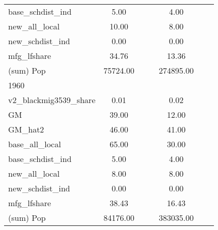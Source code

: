\begin{table}[htbp]
\begin{tabular}{l*{2}{ccc}}
base\_schdist\_ind    &        5.00&            &            &        4.00&            &            \\
new\_all\_local       &       10.00&            &            &        8.00&            &            \\
new\_schdist\_ind     &        0.00&            &            &        0.00&            &            \\
mfg\_lfshare         &       34.76&            &            &       13.36&            &            \\
(sum) Pop           &    75724.00&            &            &   274895.00&            &            \\
\midrule
1960                &            &            &            &            &            &            \\
v2\_blackmig3539\_share&        0.01&            &            &        0.02&            &            \\
GM                  &       39.00&            &            &       12.00&            &            \\
GM\_hat2             &       46.00&            &            &       41.00&            &            \\
base\_all\_local      &       65.00&            &            &       30.00&            &            \\
base\_schdist\_ind    &        5.00&            &            &        4.00&            &            \\
new\_all\_local       &        8.00&            &            &        8.00&            &            \\
new\_schdist\_ind     &        0.00&            &            &        0.00&            &            \\
mfg\_lfshare         &       38.43&            &            &       16.43&            &            \\
(sum) Pop           &    84176.00&            &            &   383035.00&            &            \\
\bottomrule
\end{tabular}
\end{table}
